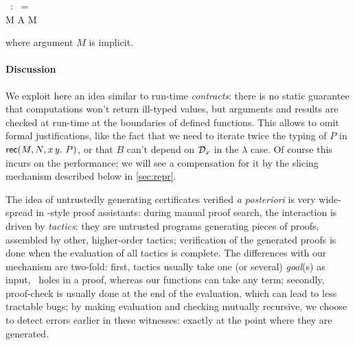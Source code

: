 \documentclass[9pt]{sigplanconf}
\begin{document}
\begin{mathleft}
  \fget{}\ :\     =
  \\\qquad\quad \lamd M \lamd A \lamd \md M
\end{mathleft}

\noindent
where argument $M$ is implicit.

\paragraph{Discussion}

We exploit here an idea similar to run-time
\emph{contracts}: %
there is no static guarantee that computations won't return ill-typed
values, but arguments and results are checked at run-time at the
boundaries of defined functions. This allows to omit formal
justifications, like the fact that we need to iterate twice the typing
of $P$ in $\text{\textsf{rec}}({M},{N},{\text{\textit{x}}}\,{\text{\textit{y}}}.\ {P})$, or that $B$ can't depend on $\mathcal D_x$ in
the $\lambda$ case. Of course this incurs on the performance; we will
see a compensation for it by the slicing mechanism described below in
\ref{sec:repr}.

The idea of untrustedly generating certificates verified \emph{a
  posteriori} is very wide-spread in -style proof
assistants: during manual proof search, the interaction is driven by
\emph{tactics}: %
they are untrusted programs generating pieces of proofs, assembled by
other, higher-order tactics; verification of the generated proofs is
done when the evaluation of all tactics is complete. The differences
with our mechanism are two-fold: first, tactics usually take one (or
several) \emph{goal}(s) as input, \ie\ holes in a proof, whereas our
functions can take any term; secondly, proof-check is usually done at
the end of the evaluation, which can lead to less tractable bugs; by
making evaluation and checking mutually recursive, we choose to detect
errors earlier in these witnesses: exactly at the point where they are
generated.
\end{document}
